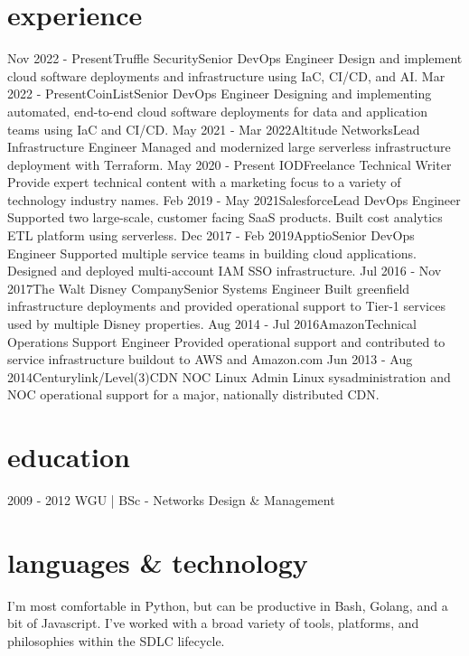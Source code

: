 \documentclass[]{mv_cv}
\begin{document}
\section{experience}
  \begin{explist}
    \expitem
    {Nov 2022 - Present}{Truffle Security}{Senior DevOps Engineer}
    {Design and implement cloud software deployments and infrastructure using IaC, CI/CD, and AI.}
    \expitem
    {Mar 2022 - Present}{CoinList}{Senior DevOps Engineer}
    {Designing and implementing automated, end-to-end cloud software deployments for data and application teams using IaC and CI/CD.}
    \expitem
    {May 2021 - Mar 2022}{Altitude Networks}{Lead Infrastructure Engineer}
    {Managed and modernized large serverless infrastructure deployment with Terraform.}
    \expitem
    {May 2020 - Present  }{IOD}{Freelance Technical Writer}
    {Provide expert technical content with a marketing focus to a variety of technology industry names.}
    \expitem
    {Feb 2019 - May 2021}{Salesforce}{Lead DevOps Engineer}
    {Supported two large-scale, customer facing SaaS products. Built cost analytics ETL platform using serverless.}
    \expitem
    {Dec 2017 - Feb 2019}{Apptio}{Senior DevOps Engineer}
    {Supported multiple service teams in building cloud applications. Designed and deployed multi-account IAM SSO infrastructure.}
    \expitem
    {Jul 2016 - Nov 2017}{The Walt Disney Company}{Senior Systems Engineer}
    {Built greenfield infrastructure deployments and provided operational support to Tier-1 services used by multiple Disney properties.}
    \expitem
    {Aug 2014 - Jul 2016}{Amazon}{Technical Operations Support Engineer}
    {Provided operational support and contributed to service infrastructure buildout to AWS and Amazon.com}
   \expitem
    {Jun 2013 - Aug 2014}{Centurylink/Level(3)}{CDN NOC Linux Admin}
    {Linux sysadministration and NOC operational support for a major, nationally distributed CDN.}
  \end{explist}

\section{education}
\begin{content}
  {2009 - 2012 WGU | BSc - Networks Design \& Management}
\end{content}

\section{languages \& technology}
\begin{content}
  {I'm most comfortable in Python, but can be productive in Bash, Golang, and a bit of Javascript. I've worked with a broad variety of tools, platforms, and philosophies within the SDLC lifecycle.}
\end{content}

\thispagestyle{empty}
\end{document}
